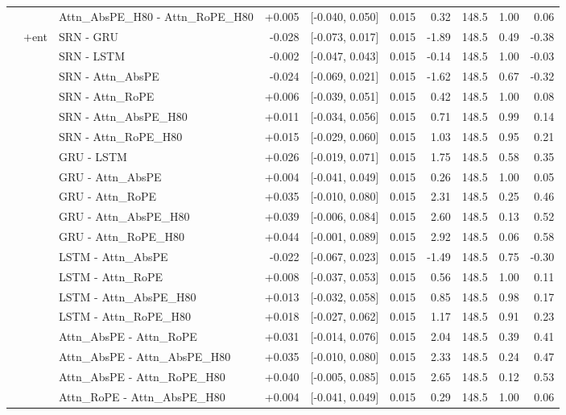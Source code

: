 \begin{longtable}{@{}lllrcrrrrr@{}}
 &  & Attn\_AbsPE\_H80 - Attn\_RoPE\_H80 & +0.005 & [-0.040, 0.050] & 0.015 & 0.32 & 148.5 & 1.00 & 0.06 \\
\addlinespace[2pt]
 & $+$ent & SRN - GRU & -0.028 & [-0.073, 0.017] & 0.015 & -1.89 & 148.5 & 0.49 & -0.38 \\
 &  & SRN - LSTM & -0.002 & [-0.047, 0.043] & 0.015 & -0.14 & 148.5 & 1.00 & -0.03 \\
 &  & SRN - Attn\_AbsPE & -0.024 & [-0.069, 0.021] & 0.015 & -1.62 & 148.5 & 0.67 & -0.32 \\
 &  & SRN - Attn\_RoPE & +0.006 & [-0.039, 0.051] & 0.015 & 0.42 & 148.5 & 1.00 & 0.08 \\
 &  & SRN - Attn\_AbsPE\_H80 & +0.011 & [-0.034, 0.056] & 0.015 & 0.71 & 148.5 & 0.99 & 0.14 \\
 &  & SRN - Attn\_RoPE\_H80 & +0.015 & [-0.029, 0.060] & 0.015 & 1.03 & 148.5 & 0.95 & 0.21 \\
 &  & GRU - LSTM & +0.026 & [-0.019, 0.071] & 0.015 & 1.75 & 148.5 & 0.58 & 0.35 \\
 &  & GRU - Attn\_AbsPE & +0.004 & [-0.041, 0.049] & 0.015 & 0.26 & 148.5 & 1.00 & 0.05 \\
 &  & GRU - Attn\_RoPE & +0.035 & [-0.010, 0.080] & 0.015 & 2.31 & 148.5 & 0.25 & 0.46 \\
 &  & GRU - Attn\_AbsPE\_H80 & +0.039 & [-0.006, 0.084] & 0.015 & 2.60 & 148.5 & 0.13 & 0.52 \\
 &  & GRU - Attn\_RoPE\_H80 & +0.044 & [-0.001, 0.089] & 0.015 & 2.92 & 148.5 & 0.06 & 0.58 \\
 &  & LSTM - Attn\_AbsPE & -0.022 & [-0.067, 0.023] & 0.015 & -1.49 & 148.5 & 0.75 & -0.30 \\
 &  & LSTM - Attn\_RoPE & +0.008 & [-0.037, 0.053] & 0.015 & 0.56 & 148.5 & 1.00 & 0.11 \\
 &  & LSTM - Attn\_AbsPE\_H80 & +0.013 & [-0.032, 0.058] & 0.015 & 0.85 & 148.5 & 0.98 & 0.17 \\
 &  & LSTM - Attn\_RoPE\_H80 & +0.018 & [-0.027, 0.062] & 0.015 & 1.17 & 148.5 & 0.91 & 0.23 \\
 &  & Attn\_AbsPE - Attn\_RoPE & +0.031 & [-0.014, 0.076] & 0.015 & 2.04 & 148.5 & 0.39 & 0.41 \\
 &  & Attn\_AbsPE - Attn\_AbsPE\_H80 & +0.035 & [-0.010, 0.080] & 0.015 & 2.33 & 148.5 & 0.24 & 0.47 \\
 &  & Attn\_AbsPE - Attn\_RoPE\_H80 & +0.040 & [-0.005, 0.085] & 0.015 & 2.65 & 148.5 & 0.12 & 0.53 \\
 &  & Attn\_RoPE - Attn\_AbsPE\_H80 & +0.004 & [-0.041, 0.049] & 0.015 & 0.29 & 148.5 & 1.00 & 0.06 \\

\end{longtable}
